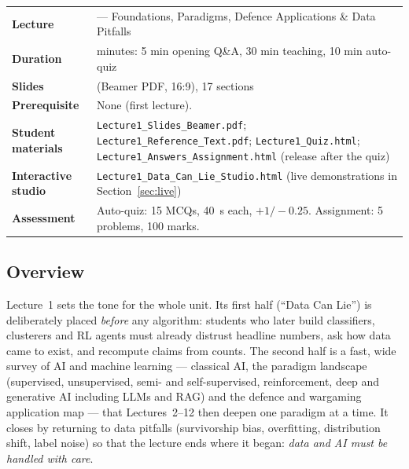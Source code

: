 \documentclass[11pt]{article}
\begin{document}
\begin{center}\small\renewcommand{\arraystretch}{1.25}\begin{tabularx}{\textwidth}{@{}>{\bfseries}p{3.3cm}>{\raggedright\arraybackslash}X@{}}\toprule

\textcolor{NavyN}{Lecture}&1 --- Foundations, Paradigms, Defence Applications \& Data Pitfalls\\
\textcolor{NavyN}{Duration}&45 minutes: 5 min opening Q\&A, 30 min teaching, 10 min auto-quiz\\
\textcolor{NavyN}{Slides}&54 (Beamer PDF, 16:9), 17 sections\\
\textcolor{NavyN}{Prerequisite}&None (first lecture).\\
\textcolor{NavyN}{Student materials}&\texttt{Lecture1\_Slides\_Beamer.pdf}; \texttt{Lecture1\_Reference\_Text.pdf}; \texttt{Lecture1\_Quiz.html}; \texttt{Lecture1\_Answers\_Assignment.html} (release after the quiz)\\
\textcolor{NavyN}{Interactive studio}&\texttt{Lecture1\_Data\_Can\_Lie\_Studio.html} (live demonstrations in Section~\ref{sec:live})\\
\textcolor{NavyN}{Assessment}&Auto-quiz: 15 MCQs, 40~s each, $+1/-0.25$. Assignment: 5 problems, 100 marks.\\\bottomrule\end{tabularx}\end{center}

\subsection*{Overview}Lecture~1 sets the tone for the whole unit. Its first half (``Data Can Lie'') is deliberately placed \emph{before} any algorithm: students who later build classifiers, clusterers and RL agents must already distrust headline numbers, ask how data came to exist, and recompute claims from counts. The second half is a fast, wide survey of AI and machine learning --- classical AI, the paradigm landscape (supervised, unsupervised, semi- and self-supervised, reinforcement, deep and generative AI including LLMs and RAG) and the defence and wargaming application map --- that Lectures~2--12 then deepen one paradigm at a time. It closes by returning to data pitfalls (survivorship bias, overfitting, distribution shift, label noise) so that the lecture ends where it began: \emph{data and AI must be handled with care}.
\end{document}
